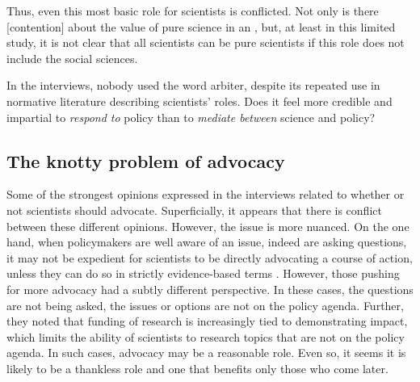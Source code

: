 Thus, even this most basic role for scientists is conflicted. Not only is there [contention] about the value of pure science in an , but, at least in this limited study, it is not clear that all scientists can be pure scientists if this role does not include the social sciences. %



In the interviews, nobody used the word arbiter, despite its repeated use in normative literature describing scientists' roles. 
Does it feel more credible and impartial to \emph{respond to} policy than  to \emph{mediate between} science and policy?

\subsection{The knotty problem of advocacy}\label{sec:disadvocacy}
Some of the strongest opinions expressed in the interviews related to whether or not scientists should advocate. Superficially, it appears that there is conflict between these different opinions. However, the issue is more nuanced. On the one hand, when policymakers are well aware of an issue, indeed are asking questions, it may not be expedient for scientists to be directly advocating a course of action, unless they can do so in strictly evidence-based terms %
. However, those pushing for more advocacy had a subtly different perspective. In these cases, the questions are not being asked, the issues or options are not on the policy agenda. Further, they noted that funding of research is increasingly tied to demonstrating impact, which limits the ability of scientists to research topics that are not on the policy agenda. In such cases, advocacy may be a reasonable role. Even so, it seems it is likely to be a thankless role and one that benefits only those who come later. 

 

